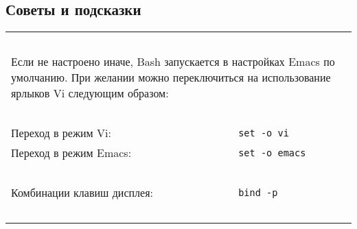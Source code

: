 \documentclass[10pt]{article}
\begin{document}
\begin{multicols}{2}
\section{Советы и подсказки}
\begin{tabular}{ p{4.5cm} p{6.5cm} }
  \hline
~ & ~ \\
\multicolumn{2}{p{11.2cm}}{Если не настроено иначе, Bash запускается в настройках Emacs по умолчанию. При желании можно переключиться на использование ярлыков Vi следующим образом:}\\
~ & ~ \\
Переход в режим Vi: & \texttt{set -o vi} \\ 
Переход в режим Emacs: & \texttt{set -o emacs} \\ 
~ & ~ \\
Комбинации клавиш дисплея: & \texttt{bind -p} \\ 
~ & ~ \\
  \hline
\end{tabular}

\end{multicols}
\end{document}
